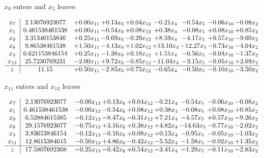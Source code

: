 \documentclass[9pt]{article}
\begin{document}
 $ x_{9} $ enters and $ x_{5} $ leaves 

 \[\begin{array}{c| c c@{\hskip 2pt} c@{\hskip 2pt} c@{\hskip 2pt} c@{\hskip 2pt} c@{\hskip 2pt} c@{\hskip 2pt} c@{\hskip 2pt} }
 x_{7}   &  2.13076923077 & +  0.00 x_{11} & +  0.13 x_{6} & +  0.04 x_{12} & -0.21 x_{4} & -0.54 x_{5} & -0.06 x_{10} & -0.08 x_{2}\\
 x_{1}   &  0.461538461538 & +  0.00 x_{11} & -0.54 x_{6} & +  0.08 x_{12} & +  0.38 x_{4} & -0.08 x_{5} & +  0.08 x_{10} & +  0.85 x_{2}\\
 x_{9}   &  3.31346153846 & +  0.25 x_{11} & -9.69 x_{6} & -0.20 x_{12} & +  8.59 x_{4} & -4.17 x_{5} & +  0.57 x_{10} & -9.60 x_{2}\\
 x_{8}   &  9.86538461538 & +  1.50 x_{11} & -4.13 x_{6} & +  1.02 x_{12} & + 13.10 x_{4} & -12.27 x_{5} & -0.73 x_{10} & -4.04 x_{2}\\
 x_{3}   &  0.621153846154 & +  0.25 x_{11} & -1.38 x_{6} & +  0.18 x_{12} & +  1.51 x_{4} & -0.56 x_{5} & -0.04 x_{10} & -1.37 x_{2}\\
 x_{13}   &  25.7230769231 & -2.00 x_{11} & +  9.72 x_{6} & -0.85 x_{12} & -11.03 x_{4} & -3.15 x_{5} & -0.05 x_{10} & +  2.69 x_{2}\\
\hline
z    &  11.15 & +  0.50 x_{11} & -2.85 x_{6} & +  0.75 x_{12} & -0.65 x_{4} & -0.50 x_{5} & -0.10 x_{10} & -3.50 x_{2}\\
\end{array}\]


 $ x_{11} $ enters and $ x_{13} $ leaves 

 \[\begin{array}{c| c c@{\hskip 2pt} c@{\hskip 2pt} c@{\hskip 2pt} c@{\hskip 2pt} c@{\hskip 2pt} c@{\hskip 2pt} c@{\hskip 2pt} }
 x_{7}   &  2.13076923077 & -0.00 x_{13} & +  0.13 x_{6} & +  0.04 x_{12} & -0.21 x_{4} & -0.54 x_{5} & -0.06 x_{10} & -0.08 x_{2}\\
 x_{1}   &  0.461538461538 & -0.00 x_{13} & -0.54 x_{6} & +  0.08 x_{12} & +  0.38 x_{4} & -0.08 x_{5} & +  0.08 x_{10} & +  0.85 x_{2}\\
 x_{9}   &  6.52884615385 & -0.12 x_{13} & -8.47 x_{6} & -0.31 x_{12} & +  7.21 x_{4} & -4.57 x_{5} & +  0.57 x_{10} & -9.26 x_{2}\\
 x_{8}   &  29.1576923077 & -0.75 x_{13} & +  3.16 x_{6} & +  0.38 x_{12} & +  4.82 x_{4} & -14.63 x_{5} & -0.77 x_{10} & -2.02 x_{2}\\
 x_{3}   &  3.83653846154 & -0.12 x_{13} & -0.16 x_{6} & +  0.08 x_{12} & +  0.13 x_{4} & -0.95 x_{5} & -0.05 x_{10} & -1.03 x_{2}\\
 x_{11}   &  12.8615384615 & -0.50 x_{13} & +  4.86 x_{6} & -0.42 x_{12} & -5.52 x_{4} & -1.58 x_{5} & -0.02 x_{10} & +  1.35 x_{2}\\
\hline
z    &  17.5807692308 & -0.25 x_{13} & -0.42 x_{6} & +  0.54 x_{12} & -3.41 x_{4} & -1.29 x_{5} & -0.11 x_{10} & -2.83 x_{2}\\
\end{array}\]
\end{document}
